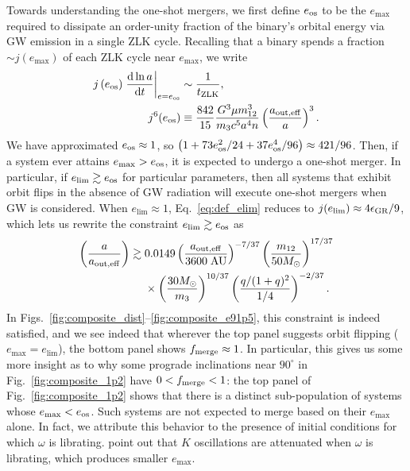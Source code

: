 \documentclass[
        fleqn,
        usenatbib,
    ]{mnras}
\newcommand*{\rd}[2]{\frac{\mathrm{d}#1}{\mathrm{d}#2}}
\newcommand*{\at}[1]{\left.#1\right|}
\newcommand*{\p}[1]{\left(#1\right)}
\begin{document}
Towards understanding the one-shot mergers, we first define $e_{\rm os}$ to be
the $e_{\max}$ required to dissipate an order-unity fraction of the binary's
orbital energy via GW emission in a single ZLK cycle. Recalling that a binary
spends a fraction $\sim j(e_{\max})$ of each ZLK cycle near $e_{\max}$, we write
\begin{align}
    j\p{e_{\rm os}}\at{\rd{\ln a}{t}}_{e = e_{\rm os}} &\sim
        \frac{1}{t_{\rm ZLK}},\\
    j^6(e_{\rm os})
        &\equiv \frac{842}{15}
            \frac{G^3 \mu m_{12}^3}{m_3c^5a^4n}
            \p{\frac{a_{\rm out, eff}}{a}}^3.
            \label{eq:def_e_os}
\end{align}
We have approximated $e_{\rm os} \approx 1$, so $\p{1 + 73e_{\rm os}^2/24 + 37
e_{\rm os}^4/96} \approx 421 / 96$. Then, if a system ever attains $e_{\max} >
e_{\rm os}$, it is expected to undergo a one-shot merger. In particular, if
$e_{\lim} \gtrsim e_{\rm os}$ for particular parameters, then all systems that
exhibit orbit flips in the absence of GW radiation will execute one-shot mergers
when GW is considered. When $e_{\lim} \approx 1$, Eq.~\eqref{eq:def_elim}
reduces to $j(e_{\lim}) \approx 4\epsilon_{\rm GR} / 9$, which lets us rewrite
the constraint $e_{\lim} \gtrsim e_{\rm os}$ as
\begin{align}
    \p{\frac{a}{a_{\rm out, eff}}} \gtrsim{}&
        0.0149
        \p{\frac{a_{\rm out, eff}}{3600\;\mathrm{AU}}}^{-7/37}
        \p{\frac{m_{12}}{50M_{\odot}}}^{17/37}\nonumber\\
        &\times\p{\frac{30M_{\odot}}{m_3}}^{10/37}
        \p{\frac{q / (1 + q)^2}{1/4}}^{-2/37}.\label{eq:q_237}
\end{align}
In Figs.~\ref{fig:composite_dist}--\ref{fig:composite_e91p5}, this constraint is
indeed satisfied, and we see indeed that wherever the top panel suggests orbit
flipping ($e_{\max} = e_{\lim}$), the bottom panel shows $f_{\rm merge} \approx
1$. In particular, this gives us some more insight as to why some prograde
inclinations near $90^\circ$ in Fig.~\ref{fig:composite_1p2} have $0 < f_{\rm
merge} < 1$: the top panel of Fig.~\ref{fig:composite_1p2} shows that there is a
distinct sub-population of systems whose $e_{\max} < e_{\rm os}$. Such systems
are not expected to merge based on their $e_{\max}$ alone. In fact, we attribute
this behavior to the presence of initial conditions for which $\omega$ is
librating. \citet{katz2011long} point out that $K$ oscillations are attenuated
when $\omega$ is librating, which produces smaller $e_{\max}$.
\end{document}
